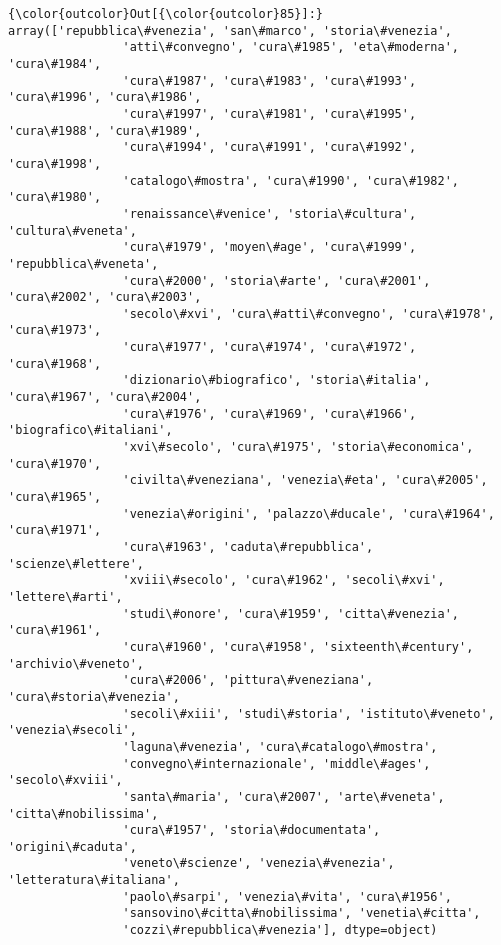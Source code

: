 \documentclass[11pt]{article}
\begin{document}
\begin{Verbatim}[commandchars=\\\{\}]
{\color{outcolor}Out[{\color{outcolor}85}]:} array(['repubblica\#venezia', 'san\#marco', 'storia\#venezia',
                'atti\#convegno', 'cura\#1985', 'eta\#moderna', 'cura\#1984',
                'cura\#1987', 'cura\#1983', 'cura\#1993', 'cura\#1996', 'cura\#1986',
                'cura\#1997', 'cura\#1981', 'cura\#1995', 'cura\#1988', 'cura\#1989',
                'cura\#1994', 'cura\#1991', 'cura\#1992', 'cura\#1998',
                'catalogo\#mostra', 'cura\#1990', 'cura\#1982', 'cura\#1980',
                'renaissance\#venice', 'storia\#cultura', 'cultura\#veneta',
                'cura\#1979', 'moyen\#age', 'cura\#1999', 'repubblica\#veneta',
                'cura\#2000', 'storia\#arte', 'cura\#2001', 'cura\#2002', 'cura\#2003',
                'secolo\#xvi', 'cura\#atti\#convegno', 'cura\#1978', 'cura\#1973',
                'cura\#1977', 'cura\#1974', 'cura\#1972', 'cura\#1968',
                'dizionario\#biografico', 'storia\#italia', 'cura\#1967', 'cura\#2004',
                'cura\#1976', 'cura\#1969', 'cura\#1966', 'biografico\#italiani',
                'xvi\#secolo', 'cura\#1975', 'storia\#economica', 'cura\#1970',
                'civilta\#veneziana', 'venezia\#eta', 'cura\#2005', 'cura\#1965',
                'venezia\#origini', 'palazzo\#ducale', 'cura\#1964', 'cura\#1971',
                'cura\#1963', 'caduta\#repubblica', 'scienze\#lettere',
                'xviii\#secolo', 'cura\#1962', 'secoli\#xvi', 'lettere\#arti',
                'studi\#onore', 'cura\#1959', 'citta\#venezia', 'cura\#1961',
                'cura\#1960', 'cura\#1958', 'sixteenth\#century', 'archivio\#veneto',
                'cura\#2006', 'pittura\#veneziana', 'cura\#storia\#venezia',
                'secoli\#xiii', 'studi\#storia', 'istituto\#veneto', 'venezia\#secoli',
                'laguna\#venezia', 'cura\#catalogo\#mostra',
                'convegno\#internazionale', 'middle\#ages', 'secolo\#xviii',
                'santa\#maria', 'cura\#2007', 'arte\#veneta', 'citta\#nobilissima',
                'cura\#1957', 'storia\#documentata', 'origini\#caduta',
                'veneto\#scienze', 'venezia\#venezia', 'letteratura\#italiana',
                'paolo\#sarpi', 'venezia\#vita', 'cura\#1956',
                'sansovino\#citta\#nobilissima', 'venetia\#citta',
                'cozzi\#repubblica\#venezia'], dtype=object)
\end{Verbatim}
            
\end{document}
